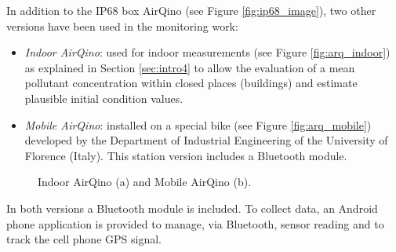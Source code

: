 \documentclass[journal]{IEEEtran}
\begin{document}
In addition to the IP68 box AirQino (see Figure \ref{fig:ip68_image}), two other versions have been used in the monitoring work:%
\begin{itemize}
\item \textit{Indoor AirQino}: used for indoor measurements (see Figure \ref{fig:arq_indoor}) as explained in Section \ref{sec:intro4} to allow the evaluation of a mean pollutant concentration within closed places (buildings) and estimate plausible initial condition values.
\item \textit{Mobile AirQino}: installed on a special bike (see Figure \ref{fig:arq_mobile}) developed by the Department of Industrial Engineering of the University of Florence (Italy). This station version includes a Bluetooth module. 
\end{itemize}
\begin{figure}[tbp]
	\centering
	\hfil
	\caption{Indoor AirQino (a) and Mobile AirQino (b).}
	\label{fig:arq_ind_mobile}
\end{figure}
In both versions a Bluetooth module is included. To collect data, an Android phone application  is provided to manage, via Bluetooth, sensor reading and to track the cell phone GPS signal.
\end{document}
